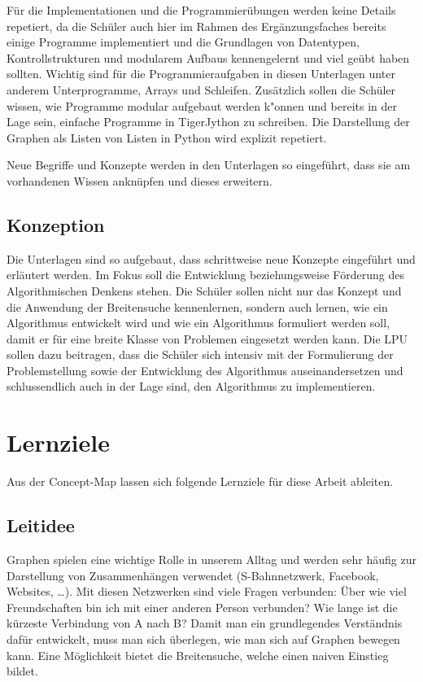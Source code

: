 F\"ur die Implementationen und die Programmier\"ubungen werden keine Details repetiert, da die Sch\"uler auch hier im Rahmen des Erg\"anzungsfaches bereits einige Programme implementiert und die Grundlagen von Datentypen, Kontrollstrukturen und modularem Aufbaus kennengelernt und viel ge\"ubt haben sollten. 
Wichtig sind f\"ur die Programmieraufgaben in diesen Unterlagen unter anderem Unterprogramme, Arrays und Schleifen.
Zus\"atzlich sollen die Sch\"uler  wissen, wie Programme modular aufgebaut werden k"onnen und bereits in der Lage sein, einfache Programme in TigerJython zu schreiben. 
Die Darstellung der Graphen als Listen von Listen in Python wird explizit repetiert.


Neue Begriffe und Konzepte werden in den Unterlagen so eingef\"uhrt, dass sie am vorhandenen Wissen ankn\"upfen und dieses erweitern.

\subsection{Konzeption}
Die Unterlagen sind so aufgebaut, dass schrittweise neue Konzepte eingef\"uhrt und erl\"autert werden. Im Fokus soll die Entwicklung beziehungsweise F\"orderung des Algorithmischen Denkens stehen. Die Sch\"uler sollen nicht nur das Konzept und die Anwendung der Breitensuche kennenlernen, sondern auch lernen, wie ein Algorithmus entwickelt wird und wie ein Algorithmus formuliert werden soll, damit er f\"ur eine breite Klasse von Problemen eingesetzt werden kann. Die LPU sollen dazu beitragen, dass die Sch\"uler sich intensiv mit der Formulierung der Problemstellung sowie der Entwicklung des Algorithmus auseinandersetzen und schlussendlich auch in der Lage sind, den Algorithmus zu implementieren.


\section{Lernziele}

Aus der Concept-Map lassen sich folgende Lernziele für diese Arbeit ableiten. 

\subsection{Leitidee}

Graphen spielen eine wichtige Rolle in unserem Alltag und werden sehr häufig zur Darstellung von Zusammenhängen verwendet (S-Bahnnetzwerk, Facebook, Websites, \dots). 
Mit diesen Netzwerken sind viele Fragen verbunden: Über wie viel Freundschaften bin ich mit einer anderen Person verbunden? Wie lange ist die kürzeste Verbindung von A nach B?
Damit man ein grundlegendes Verständnis dafür entwickelt, muss man sich überlegen, wie man sich auf Graphen bewegen kann. 
Eine Möglichkeit bietet die Breitensuche, welche einen naiven Einstieg bildet. 


